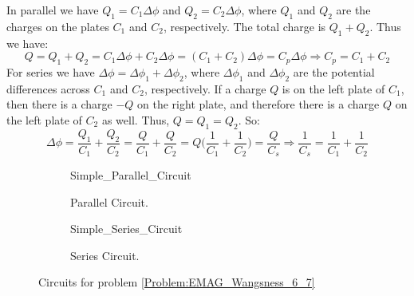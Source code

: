 \documentclass[crop=false,class=article,oneside]{standalone}
\begin{document}
        In parallel we have $Q_{1}=C_{1}\Delta\phi$
        and $Q_{2}=C_{2}\Delta\phi$,
        where $Q_{1}$ and $Q_{2}$ are the charges on the
        plates $C_{1}$ and $C_{2}$, respectively.
        The total charge is $Q_{1}+Q_{2}$. Thus we have:
        \begin{equation*}
            Q=Q_{1}+Q_{2}
             =C_{1}\Delta\phi+C_{2}\Delta\phi
             =(C_{1}+C_{2})\Delta\phi
             =C_{p}\Delta\phi
            \Rightarrow{C_{p}}=C_{1}+C_{2}
        \end{equation*}
        For series we have
        $\Delta\phi=\Delta\phi_{1}+\Delta\phi_{2}$,
        where $\Delta\phi_{1}$ and $\Delta\phi_{2}$
        are the potential differences across $C_{1}$ and $C_{2}$,
        respectively. If a charge $Q$ is on the left plate
        of $C_{1}$, then there is a charge $-Q$ on the right
        plate, and therefore there is a charge $Q$ on the
        left plate of $C_{2}$ as well. Thus, $Q=Q_{1}=Q_{2}$.
        So:
        \begin{equation*}
            \Delta\phi=\frac{Q_{1}}{C_{1}}+\frac{Q_{2}}{C_{2}}
            =\frac{Q}{C_{1}}+\frac{Q}{C_{2}}
            =Q\big(\frac{1}{C_{1}}+\frac{1}{C_{2}}\big)
            =\frac{Q}{C_{s}}
            \Rightarrow\frac{1}{C_{s}}
            =\frac{1}{C_{1}}+\frac{1}{C_{2}}
        \end{equation*}
        \begin{figure}
            \centering
            \captionsetup{type=figure}
            \begin{subfigure}[b]{0.49\textwidth}
                \centering
                \captionsetup{type=figure}
                
                          {Simple_Parallel_Circuit}
                \caption{Parallel Circuit.}
                \label{fig:EMAG_Parallel_Circuit}
            \end{subfigure}
            \begin{subfigure}[b]{0.49\textwidth}
                \centering
                \captionsetup{type=figure}
                
                          {Simple_Series_Circuit}
                \caption{Series Circuit.}
                \label{fig:EMAG_Series_Circuit}
            \end{subfigure}
            \caption{%
                Circuits for problem
                \ref{Problem:EMAG_Wangsness_6_7}
            }
            \label{fig:EMAG_Wangsness_6_7}
        \end{figure}
\end{document}
